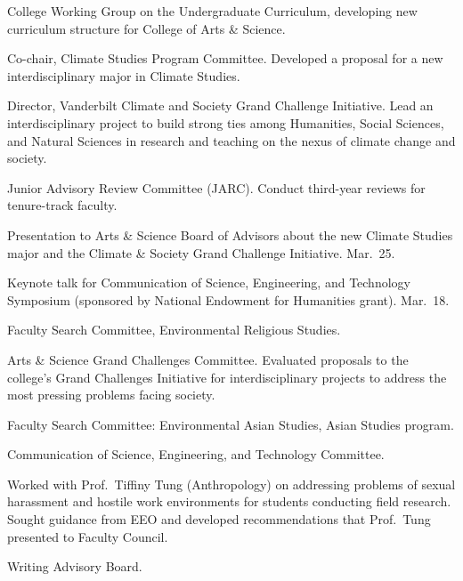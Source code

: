 \item[2022--present] College Working Group on the Undergraduate Curriculum,
  developing new curriculum structure for College of Arts \& Science.
\item[2021--present] Co-chair, Climate Studies Program Committee.
  Developed a proposal for a new interdisciplinary major in Climate Studies.
\item[2020--present] Director, Vanderbilt Climate and Society Grand Challenge
  Initiative. Lead an interdisciplinary project to build strong ties among
  Humanities, Social Sciences, and Natural Sciences in research and teaching on
  the nexus of climate change and society.
\item[2020--2022] Junior Advisory Review Committee (JARC).
  Conduct third-year reviews for tenure-track faculty.
\item[2022] Presentation to Arts \& Science Board of Advisors about the new
  Climate Studies major and the Climate \& Society Grand Challenge Initiative.
  Mar.~25.
\item[2022] Keynote talk for Communication of Science, Engineering, and
  Technology Symposium (sponsored by National Endowment for Humanities grant).
  Mar.~18.
\item[2021--2022] Faculty Search Committee, Environmental Religious Studies.
\item[2019--2020] Arts \& Science Grand Challenges Committee.
  Evaluated proposals to the college's Grand Challenges Initiative for
  interdisciplinary projects to address the most pressing problems facing
  society.
\item[2019--2020] Faculty Search Committee: Environmental Asian Studies, Asian Studies program.
\item[2003--2018] Communication of Science, Engineering, and Technology Committee.
\item[2014--2015] Worked with Prof.\ Tiffiny Tung (Anthropology) on addressing problems of sexual harassment and hostile work environments for students conducting field research. Sought guidance from EEO and developed recommendations that Prof.\ Tung presented to Faculty Council.
\item[2004--2009] Writing Advisory Board.
